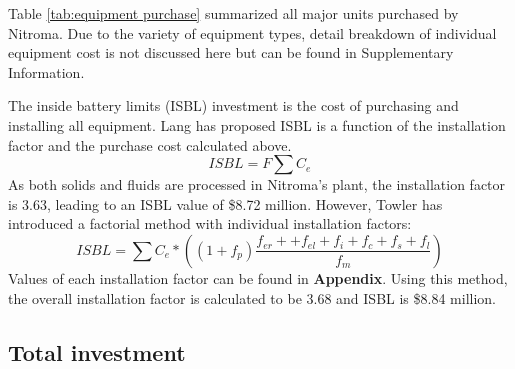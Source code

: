 Table \ref{tab:equipment purchase} summarized all major units purchased by Nitroma. Due to the variety of equipment types, detail breakdown of individual equipment cost is not discussed here but can be found in Supplementary Information.

The inside battery limits (ISBL) investment is the cost of purchasing and installing all equipment. Lang has proposed ISBL is a function of the installation factor and the purchase cost calculated above.
\begin{equation}
    ISBL=F\sum C_{e}    
\end{equation}
As both solids and fluids are processed in Nitroma's plant, the installation factor is 3.63, leading to an ISBL value of \$8.72 million. However, Towler\cite{sinnott_chemical_2020} has introduced a factorial method with individual installation factors:
\begin{equation}
    ISBL=\sum C_{e}*\left(\left(1+f_{p}\right)\frac{f_{er}++f_{el}+f_{i}+f_{c}+f_{s}+f_{l}}{f_{m}}\right)
\end{equation}
Values of each installation factor can be found in \textbf{Appendix}. Using this method, the overall installation factor is calculated to be 3.68 and ISBL is \$8.84 million.

\subsection{Total investment}


